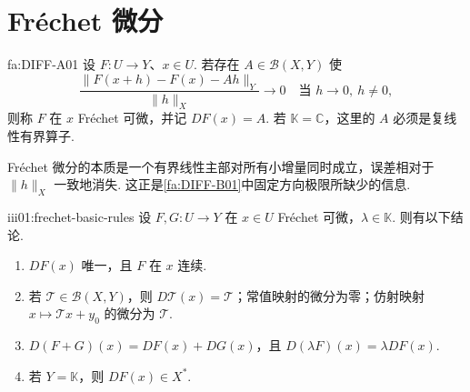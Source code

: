\section{Fréchet 微分}\label{sec:iii01-frechet}

\begin{FADefinition}[A][Fréchet 微分]{fa:DIFF-A01}
设 \(\displaystyle F:U\to Y\)、\(\displaystyle x\in U\). 若存在 \(\displaystyle A\in\mathcal B(X,Y)\) 使
\[
\frac{\|F(x+h)-F(x)-Ah\|_Y}{\|h\|_X}
\longrightarrow0
\quad
\text{当 }h\to0,\ h\neq0,
\]
则称 \(\displaystyle F\) 在 \(\displaystyle x\) Fréchet 可微，并记 \(\displaystyle DF(x)=A\). 若 \(\displaystyle\mathbb K=\mathbb C\)，这里的 \(\displaystyle A\) 必须是复线性有界算子.
\end{FADefinition}

Fréchet 微分的本质是一个有界线性主部对所有小增量同时成立，误差相对于 \(\displaystyle\|h\|_X\) 一致地消失. 这正是\autoref{fa:DIFF-B01}中固定方向极限所缺少的信息.

\begin{FAProposition}{iii01:frechet-basic-rules}
设 \(\displaystyle F,G:U\to Y\) 在 \(\displaystyle x\in U\) Fréchet 可微，\(\displaystyle\lambda\in\mathbb K\). 则有以下结论.
\begin{enumerate}
\item \(\displaystyle DF(x)\) 唯一，且 \(\displaystyle F\) 在 \(\displaystyle x\) 连续.
\item 若 \(\displaystyle\mathcal T\in\mathcal B(X,Y)\)，则 \(\displaystyle D\mathcal T(x)=\mathcal T\)；常值映射的微分为零；仿射映射 \(\displaystyle x\mapsto\mathcal Tx+y_0\) 的微分为 \(\displaystyle\mathcal T\).
\item \(\displaystyle D(F+G)(x)=DF(x)+DG(x)\)，且 \(\displaystyle D(\lambda F)(x)=\lambda DF(x)\).
\item 若 \(\displaystyle Y=\mathbb K\)，则 \(\displaystyle DF(x)\in X^*\).
\end{enumerate}
\end{FAProposition}

